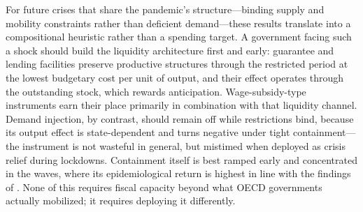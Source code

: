 \documentclass[12pt, a4paper]{article}
\begin{document}
For future crises that share the pandemic's structure---binding supply and mobility constraints rather than deficient demand---these results translate into a compositional heuristic rather than a spending target. A government facing such a shock should build the liquidity architecture first and early: guarantee and lending facilities preserve productive structures through the restricted period at the lowest budgetary cost per unit of output, and their effect operates through the outstanding stock, which rewards anticipation. Wage-subsidy-type instruments earn their place primarily in combination with that liquidity channel. Demand injection, by contrast, should remain off while restrictions bind, because its output effect is state-dependent and turns negative under tight containment---the instrument is not wasteful in general, but mistimed when deployed as crisis relief during lockdowns. Containment itself is best ramped early and concentrated in the waves, where its epidemiological return is highest in line with the findings of \citep{acemoglu2021}. None of this requires fiscal capacity beyond what OECD governments actually mobilized; it requires deploying it differently.
\end{document}
